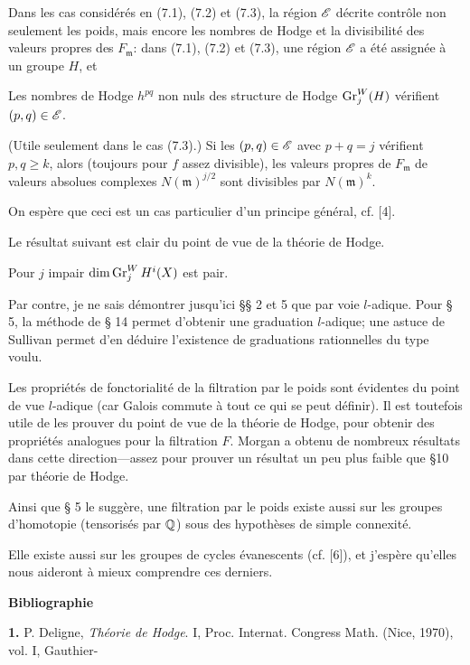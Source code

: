 \documentclass[8pt]{extarticle}
\begin{document}
 Dans les cas considérés en (7.1), (7.2) et (7.3), la région \(\mathscr{E}\) décrite contrôle non seulement les poids, mais encore les nombres de Hodge et la divisibilité des valeurs propres des \(F_{\mathfrak m}\): dans (7.1), (7.2) et (7.3), une région \(\mathscr{E}\) a été assignée à un groupe \(H\), et

 Les nombres de Hodge \(h^{pq}\) non nuls des structure de Hodge \(\operatorname{Gr}_j^W(H)\) vérifient \((p,q)\in\mathscr{E}\).

 (Utile seulement dans le cas (7.3).) Si les \((p,q)\in\mathscr{E}\) avec \(p+q=j\) vérifient \(p,q\ge k\), alors (toujours pour \(f\) assez divisible), les valeurs propres de \(F_{\mathfrak m}\) de valeurs absolues complexes \(N(\mathfrak m)^{j/2}\) sont divisibles par \(N(\mathfrak m)^k\).

On espère que ceci est un cas particulier d'un principe général, cf. [4].

 Le résultat suivant est clair du point de vue de la théorie de Hodge.

 Pour \(j\) impair \(\dim\operatorname{Gr}_j^W H^i(X)\) est pair.

Par contre, je ne sais démontrer jusqu'ici §§ 2 et 5 que par voie \(l\)-adique. Pour § 5, la méthode de § 14 permet d'obtenir une graduation \(l\)-adique; une astuce de Sullivan permet d'en déduire l'existence de graduations rationnelles du type voulu.

Les propriétés de fonctorialité de la filtration par le poids sont évidentes du point de vue \(l\)-adique (car Galois commute à tout ce qui se peut définir). Il est toutefois utile de les prouver du point de vue de la théorie de Hodge, pour obtenir des propriétés analogues pour la filtration \(F\). Morgan a obtenu de nombreux résultats dans cette direction---assez pour prouver un résultat un peu plus faible que §10 par théorie de Hodge.

 Ainsi que § 5 le suggère, une filtration par le poids existe aussi sur les groupes d'homotopie (tensorisés par \(\mathbb{Q}\)) sous des hypothèses de simple connexité.

Elle existe aussi sur les groupes de cycles évanescents (cf. [6]), et j'espère qu'elles nous aideront à mieux comprendre ces derniers.

\begin{center}\sffamily\bfseries Bibliographie\end{center}

\noindent\textbf{1.} P. Deligne, \emph{Théorie de Hodge}. I, Proc. Internat. Congress Math. (Nice, 1970), vol. I, Gauthier-
\EndSourcePage
\end{document}
